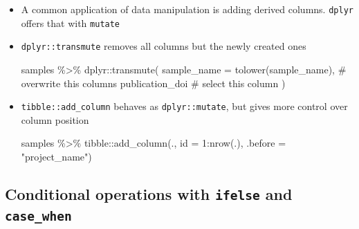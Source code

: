 \documentclass[
  letterpaper,
]{book}
\newenvironment{Shaded}{}{}
\newcommand{\AttributeTok}[1]{\textcolor[rgb]{0.84,0.23,0.29}{#1}}
\newcommand{\CommentTok}[1]{\textcolor[rgb]{0.42,0.45,0.49}{#1}}
\newcommand{\DecValTok}[1]{\textcolor[rgb]{0.00,0.36,0.77}{#1}}
\newcommand{\FunctionTok}[1]{\textcolor[rgb]{0.44,0.26,0.76}{#1}}
\newcommand{\NormalTok}[1]{\textcolor[rgb]{0.14,0.16,0.18}{#1}}
\newcommand{\SpecialCharTok}[1]{\textcolor[rgb]{0.00,0.36,0.77}{#1}}
\newcommand{\StringTok}[1]{\textcolor[rgb]{0.01,0.18,0.38}{#1}}
\begin{document}
\begin{itemize}
\item
  A common application of data manipulation is adding derived columns.
  \texttt{dplyr} offers that with \texttt{mutate}

\begin{Shaded}
\end{Shaded}
\item
  \texttt{dplyr::transmute} removes all columns but the newly created
  ones

\begin{Shaded}
\begin{Highlighting}[]
\NormalTok{samples }\SpecialCharTok{\%\textgreater{}\%}
\NormalTok{dplyr}\SpecialCharTok{::}\FunctionTok{transmute}\NormalTok{(}
    \AttributeTok{sample\_name =} \FunctionTok{tolower}\NormalTok{(sample\_name), }\CommentTok{\# overwrite this columns}
\NormalTok{    publication\_doi                     }\CommentTok{\# select this column}
\NormalTok{)}
\end{Highlighting}
\end{Shaded}
\item
  \texttt{tibble::add\_column} behaves as \texttt{dplyr::mutate}, but
  gives more control over column position

\begin{Shaded}
\begin{Highlighting}[]
\NormalTok{samples }\SpecialCharTok{\%\textgreater{}\%}\NormalTok{ tibble}\SpecialCharTok{::}\FunctionTok{add\_column}\NormalTok{(., }\AttributeTok{id =} \DecValTok{1}\SpecialCharTok{:}\FunctionTok{nrow}\NormalTok{(.), }\AttributeTok{.before =} \StringTok{"project\_name"}\NormalTok{)}
\end{Highlighting}
\end{Shaded}
\end{itemize}

\hypertarget{conditional-operations-with-ifelse-and-case_when}{%
\subsection{\texorpdfstring{Conditional operations with \texttt{ifelse}
and
\texttt{case\_when}}{Conditional operations with ifelse and case\_when}}\label{conditional-operations-with-ifelse-and-case_when}}
\end{document}
